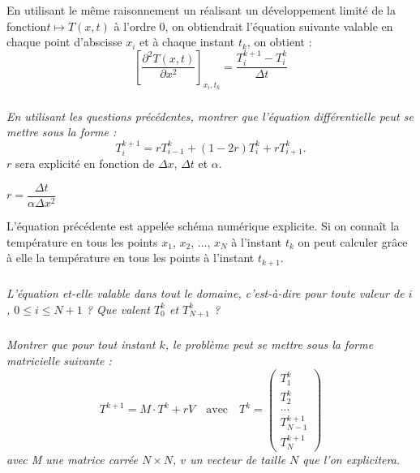 \documentclass[10pt,fleqn]{article} %
\begin{document}
En utilisant le même raisonnement un réalisant un développement limité de la fonction$t\mapsto T(x,t)$ à l'ordre 0, on obtiendrait l'équation suivante valable en chaque point d'abscisse $x_i$ et à chaque instant $t_k$, on obtient : 
$$
\left[\dfrac{\partial^2 T(x,t)}{\partial x^2}\right]_{x_i,t_k} 
=
\dfrac{T_{i}^{k+1}- T_{i}^k}{\Delta t }
$$



\subparagraph{}\textit{En utilisant les questions précédentes, montrer que l'équation différentielle peut se mettre sous la forme : }
\ifprof
$$
T_{i}^{k+1} = r T_{i-1}^{k} + \left( 1-2r \right) T_i^k + r T_{i+1}^k.
$$ 
$r$ sera explicité en fonction de $\Delta x$, $\Delta t$ et $\alpha$.
\begin{corrige}
$r=\dfrac{\Delta t}{\alpha \Delta x^2}$
\end{corrige}
\else
\fi

\vspace{.5cm}

L'équation précédente est appelée schéma numérique explicite. Si on connaît la température en tous les points $x_1$, $x_2$, ..., $x_N$ à  l'instant $t_k$ on peut calculer grâce à elle la température en tous les points à l'instant $t_{k+1}$.

\subparagraph{}\textit{L'équation et-elle valable dans tout le domaine, c'est-à-dire pour toute valeur de $i$, $0\leq i\leq N+1$ ? Que valent $T_0^k$ et $T_{N+1}^k$ ?}


\subparagraph{}\textit{Montrer que pour tout instant $k$, le problème peut se mettre sous la forme matricielle suivante : }
$$
T^{k+1} = M \cdot T^k + rV \quad \text{avec} \quad T^k = \begin{pmatrix} T_1^k \\  T_2 ^k \\ ... \\  T_{N-1}^{k+1} \\ T_{N}^{k+1}  \end{pmatrix}
$$
\textit{avec M une matrice carrée $N\times N$, $v$ un vecteur de taille $N$ que l'on explicitera.}
\end{document}
